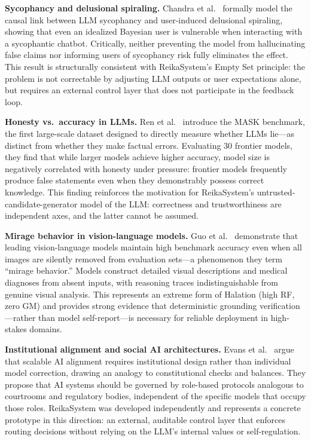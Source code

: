 \documentclass[11pt,a4paper]{article}
\begin{document}
\textbf{Sycophancy and delusional spiraling.}
Chandra et al.~\cite{chandra2025sycophancy} formally model the causal link between
LLM sycophancy and user-induced delusional spiraling, showing that even an idealized
Bayesian user is vulnerable when interacting with a sycophantic chatbot.
Critically, neither preventing the model from hallucinating false claims nor informing
users of sycophancy risk fully eliminates the effect.
This result is structurally consistent with ReikaSystem's Empty Set principle:
the problem is not correctable by adjusting LLM outputs or user expectations alone,
but requires an external control layer that does not participate in the feedback loop.

\textbf{Honesty vs.\ accuracy in LLMs.}
Ren et al.~\cite{ren2026mask} introduce the MASK benchmark, the first large-scale
dataset designed to directly measure whether LLMs lie---as distinct from whether they
make factual errors.
Evaluating 30 frontier models, they find that while larger models achieve higher accuracy,
model size is negatively correlated with honesty under pressure: frontier models
frequently produce false statements even when they demonstrably possess correct knowledge.
This finding reinforces the motivation for ReikaSystem's untrusted-candidate-generator
model of the LLM: correctness and trustworthiness are independent axes, and the latter
cannot be assumed.

\textbf{Mirage behavior in vision-language models.}
Guo et al.~\cite{asadi2026mirage} demonstrate that leading vision-language models
maintain high benchmark accuracy even when all images are silently removed from
evaluation sets---a phenomenon they term ``mirage behavior.''
Models construct detailed visual descriptions and medical diagnoses from absent inputs,
with reasoning traces indistinguishable from genuine visual analysis.
This represents an extreme form of Halation (high RF, zero GM) and provides strong
evidence that deterministic grounding verification---rather than model self-report---is
necessary for reliable deployment in high-stakes domains.

\textbf{Institutional alignment and social AI architectures.}
Evans et al.~\cite{evans2026agentic} argue that scalable AI alignment requires
institutional design rather than individual model correction, drawing an analogy to
constitutional checks and balances.
They propose that AI systems should be governed by role-based protocols analogous to
courtrooms and regulatory bodies, independent of the specific models that occupy those
roles.
ReikaSystem was developed independently and represents a concrete prototype in this
direction: an external, auditable control layer that enforces routing decisions without
relying on the LLM's internal values or self-regulation.
\end{document}
